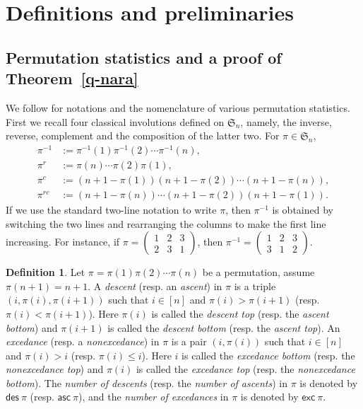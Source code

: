 \documentclass[12pt,reqno]{amsart}
\numberwithin{equation}{section}
\theoremstyle{plain}
\theoremstyle{definition}
\newtheorem{Def}[theorem]{Definition}
\def\S{\mathfrak{S}}
\def\exc{\mathsf{exc}}
\def\des{\mathsf{des}}
\def\asc{\mathsf{asc}}
\begin{document}
\section{Definitions and preliminaries}\label{sec2: Pre}
\subsection{Permutation statistics and a proof of Theorem~\ref{q-nara}}

We follow \cite{CSZ, SZ10, SZ12} for notations and the nomenclature of various permutation statistics. First we recall four classical involutions defined on $\S_n$, namely, the inverse, reverse, complement and the composition of the latter two. For $\pi\in\S_n$,
\begin{align*}
\pi^{-1} &:=\pi^{-1}(1)\pi^{-1}(2)\cdots\pi^{-1}(n),\\
\pi^r &:=\pi(n)\cdots\pi(2)\pi(1),\\
\pi^c &:=(n+1-\pi(1))(n+1-\pi(2))\cdots(n+1-\pi(n)),\\
\pi^{rc} &:=(n+1-\pi(n))\cdots(n+1-\pi(2))(n+1-\pi(1)).
\end{align*}
If we use the standard two-line notation to write $\pi$, then $\pi^{-1}$ is obtained by switching the two lines and rearranging the columns to make the first line increasing. For instance, if $\pi=\left(\begin{array}{ccc} 1 & 2 & 3\\ 2 & 3 & 1 \end{array}\right)$, then $\pi^{-1}=\left(\begin{array}{ccc} 1 & 2 & 3\\ 3 & 1 & 2 \end{array}\right)$.

\begin{Def}
Let $\pi=\pi(1)\pi(2)\cdots\pi(n)$ be a permutation, assume $\pi(n+1)=n+1$. A \emph{descent} (resp. an \emph{ascent}) in $\pi$ is a triple $(i,\pi(i),\pi(i+1))$ such that $i\in [n]$ and $\pi(i)>\pi(i+1)$ (resp. $\pi(i)<\pi(i+1)$). Here $\pi(i)$ is called the \emph{descent top} (resp. the \emph{ascent bottom}) and $\pi(i+1)$ is called the \emph{descent bottom} (resp. the \emph{ascent top}). An \emph{excedance} (resp. a \emph{nonexcedance}) in $\pi$ is a pair $(i,\pi(i))$ such that $i\in [n]$ and $\pi(i)>i$ (resp. $\pi(i)\le i$). Here $i$ is called the \emph{excedance bottom} (resp. the \emph{nonexcedance top}) and $\pi(i)$ is called the \emph{excedance top} (resp. the \emph{nonexcedance bottom}). The \emph{number of descents} (resp. the \emph{number of ascents}) in $\pi$ is denoted by $\des\:\pi$ (resp. $\asc\:\pi$), and the \emph{number of excedances} in $\pi$ is denoted by $\exc\:\pi$.
\end{Def}
\end{document}
